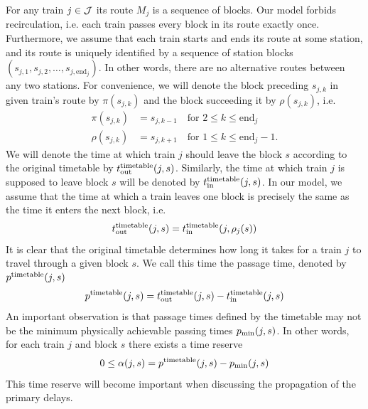 For any train $j \in \mathcal{J}$ its route $M_j$ is a sequence of blocks. Our model forbids recirculation,
i.e. each train passes every block in its route exactly once. Furthermore, we assume that each train
starts and ends its route at some station, and its route is uniquely identified by a sequence of
station blocks $\left(s_{j,1}, s_{j, 2}, \ldots, s_{j, \mbox{end}_j}\right)$. In other words, there
are no alternative routes between any two stations. For convenience, we will denote the block
preceding $s_{j,k}$ in given train's route by $\pi(s_{j,k})$ and the block succeeding it by
$\rho(s_{j,k})$, i.e.
\begin{align}
    \pi(s_{j,k}) &= s_{j,k-1} \quad \mbox{for } 2 \le k \le \mbox{end}_j \\
    \rho(s_{j,k}) &= s_{j,k+1} \quad \mbox{for } 1 \le k \le \mbox{end}_j - 1.
\end{align}
We will denote the time at which train $j$ should leave the block $s$ according to the original
timetable by $t_\text{out}^\text{timetable}(j, s)$. Similarly, the time at which train $j$ is supposed to leave block $s$
will be denoted by $t_\text{in}^\text{timetable}(j, s)$. In our model, we assume that the time at which a train leaves one
block is precisely the same as the time it enters the next block, i.e.
\begin{equation}
t_\text{out}^\text{timetable}(j, s) = t_\text{in}^\text{timetable}(j, \rho_j(s))
\end{equation}
It is clear that the original timetable determines how long it takes for a train $j$ to travel
through a given block $s$. We call this time the passage time, denoted by $p^\text{timetable}(j, s)$
\begin{equation}
    p^\text{timetable}(j, s) = t_\text{out}^\text{timetable}(j, s) - t_\text{in}^\text{timetable}(j, s)
\end{equation}
An important observation is that passage times defined by the timetable may not be the minimum physically
achievable passing times $p_\text{min}(j, s)$. In other words, for each train $j$ and block $s$ there
exists a time reserve
\begin{equation}
\label{eq:pt}
0 \le \alpha(j, s) = p^\text{timetable}(j, s) - p_\text{min}(j, s)
\end{equation}
This time reserve will become important when discussing the propagation of the primary delays.

